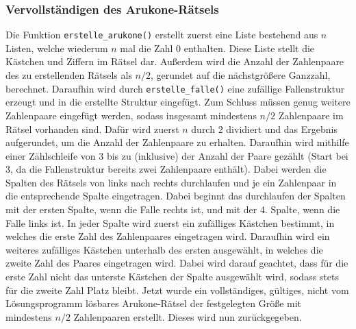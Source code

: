 \subsubsection{Vervollständigen des Arukone-Rätsels}
\begin{flushleft}
      Die Funktion \texttt{erstelle\_arukone()} erstellt zuerst eine Liste bestehend aus $n$ Listen, welche wiederum $n$ mal die Zahl $0$ enthalten. Diese Liste stellt die Kästchen und Ziffern im Rätsel dar.
      Außerdem wird die Anzahl der Zahlenpaare des zu erstellenden Rätsels als $n / 2$, gerundet auf die nächstgrößere Ganzzahl, berechnet.
      \linebreak
      \linebreak
      Daraufhin wird durch \texttt{erstelle\_falle()} eine zufällige Fallenstruktur erzeugt und in die erstellte Struktur eingefügt.
      \linebreak
      \linebreak
      Zum Schluss müssen genug weitere Zahlenpaare eingefügt werden, sodass insgesamt mindestens $n/2$ Zahlenpaare im Rätsel vorhanden sind.
      Dafür wird zuerst $n$ durch $2$ dividiert und das Ergebnis aufgerundet, um die Anzahl der Zahlenpaare zu erhalten.
      \linebreak
      \linebreak
      Daraufhin wird mithilfe einer Zählschleife von $3$ bis zu (inklusive) der Anzahl der Paare gezählt (Start bei $3$, da die Fallenstruktur bereits zwei Zahlenpaare enthält).
      Dabei werden die Spalten des Rätsels von links nach rechts durchlaufen und je ein Zahlenpaar in die entsprechende Spalte eingetragen.
      Dabei beginnt das durchlaufen der Spalten mit der ersten Spalte, wenn die Falle rechts ist, und mit der 4. Spalte, wenn die Falle links ist.
      \linebreak
      \linebreak
      In jeder Spalte wird zuerst ein zufälliges Kästchen bestimmt, in welches die erste Zahl des Zahlenpaares eingetragen wird.
      Daraufhin wird ein weiteres zufälliges Kästchen unterhalb des ersten ausgewählt, in welches die zweite Zahl des Paares eingetragen wird. Dabei wird darauf geachtet, dass für die erste Zahl nicht das unterste Kästchen der Spalte ausgewählt wird, sodass stets für die zweite Zahl Platz bleibt.
      \linebreak
      \linebreak
      Jetzt wurde ein vollständiges, gültiges, nicht vom Lösungsprogramm lösbares Arukone-Rätsel der festgelegten Größe mit mindestens $n/2$ Zahlenpaaren erstellt. Dieses wird nun zurückgegeben.
\end{flushleft}

